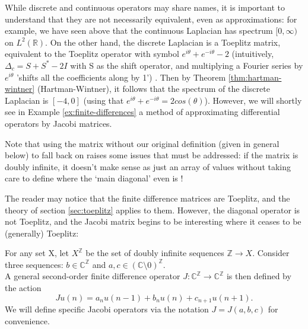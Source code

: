 \documentclass[../main.tex]{subfiles}
\begin{document}
\begin{remark}
  While discrete and continuous operators may share names, it is important to
  understand that they are not necessarily equivalent, even as approximations:
  for example, we have seen above that the continuous Laplacian has spectrum
  $[0, \infty)$ on $L^2(\mathbb{R})$. On the other hand, the discrete Laplacian
  is a Toeplitz matrix, equivalent to the Toeplitz operator with symbol 
  $e^{i \theta} + e^{-i \theta} - 2$ (intuitively, $\Delta_c = S + S^* - 2I$ with S as the
  shift operator, and multiplying a Fourier series by $e^{i \theta}$
  'shifts all the coefficients along by 1') \cite{arveson2002short}.
  Then by Theorem \ref{thm:hartman-wintner}
  (Hartman-Wintner), it follows that the spectrum of the discrete Laplacian is
  $[-4, 0]$ (using that $e^{i \theta} + e^{-i \theta} = 2cos(\theta)$).
  However, we will shortly see in Example \ref{ex:finite-differences} a method
  of approximating differential operators by Jacobi matrices.
\end{remark}

Note that using the matrix without our original definition (given in general
below) to fall back on raises some issues that must be addressed: if the matrix
is doubly infinite, it doesn't make sense as just an array of values without
taking care to define where the `main diagonal' even is \cite{lindner2013where}!

The reader may notice that the finite difference matrices are Toeplitz, and the
theory of section \ref{sec:toeplitz} applies to them. However, the diagonal
operator is not Toeplitz, and the Jacobi matrix begins to be interesting where
it ceases to be (generally) Toeplitz:

\begin{definition}
  For any set X, let $X^\mathbb{Z}$ be the set of doubly infinite sequences $\mathbb{Z}
  \rightarrow X$. Consider three sequences:
  $b \in \mathbb{C}^\mathbb{Z}$
  and $a, c \in (\mathbb{C} \setminus 0)^\mathbb{Z}$.\\
  A general second-order finite difference operator 
  $J: \mathbb{C}^\mathbb{Z} \rightarrow \mathbb{C}^\mathbb{Z}$
  is then defined by the action 
  \begin{equation}
  \label{eqn:2efde}
    Ju (n) = a_n u(n-1) + b_n u(n) + c_{n+1} u(n+1).
  \end{equation}
  We will define specific Jacobi operators via the notation $J = J(a, b, c)$
  for convenience.
\end{definition}
\end{document}
